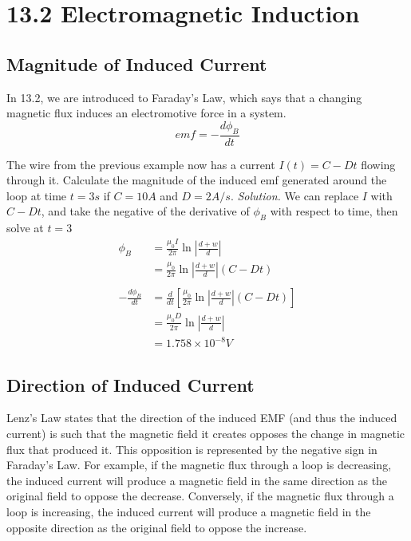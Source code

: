 \documentclass[12pt, titlepage]{article}
\begin{document}
\section*{13.2 Electromagnetic Induction}
\subsection*{Magnitude of Induced Current}
In 13.2, we are introduced to Faraday's Law, which says that a changing magnetic flux induces an electromotive force in a system.
\begin{equation*}
    emf = -\frac{d\phi_B}{dt}
\end{equation*}
\begin{Problem}
    The wire from the previous example now has a current $I(t) = C-Dt$ flowing through it. Calculate the magnitude of the induced emf generated around the loop at time $t=3s$ if $C=10A$ and $D=2A/s$.
    \tcblower
    \textit{Solution. }We can replace $I$ with $C-Dt$, and take the negative of the derivative of $\phi_B$ with respect to time, then solve at $t=3$
    \begin{align*}
        \phi_B &= \frac{\mu_0 I}{2\pi} \ln |\frac{d+w}{d}| \\
        & = \frac{\mu_0 }{2\pi} \ln |\frac{d+w}{d}| (C-Dt) \\ \\
        -\frac{d\phi_B}{dt} &= \frac{d}{dt} \left[\frac{\mu_0 }{2\pi} \ln |\frac{d+w}{d}| (C-Dt)\right] \\
        & = \frac{\mu_0 D}{2\pi} \ln |\frac{d+w}{d}| \\
        & = \boxed{1.758 \times 10^{-8} V}
    \end{align*}
\end{Problem}

\subsection*{Direction of Induced Current}
Lenz’s Law states that the direction of the induced EMF (and thus the induced current) is such that the magnetic field it creates opposes the change in magnetic flux that produced it. This opposition is represented by the negative sign in Faraday’s Law. For example, if the magnetic flux through a loop is decreasing, the induced current will produce a magnetic field in the same direction as the original field to oppose the decrease. Conversely, if the magnetic flux through a loop is increasing, the induced current will produce a magnetic field in the opposite direction as the original field to oppose the increase.
\end{document}
